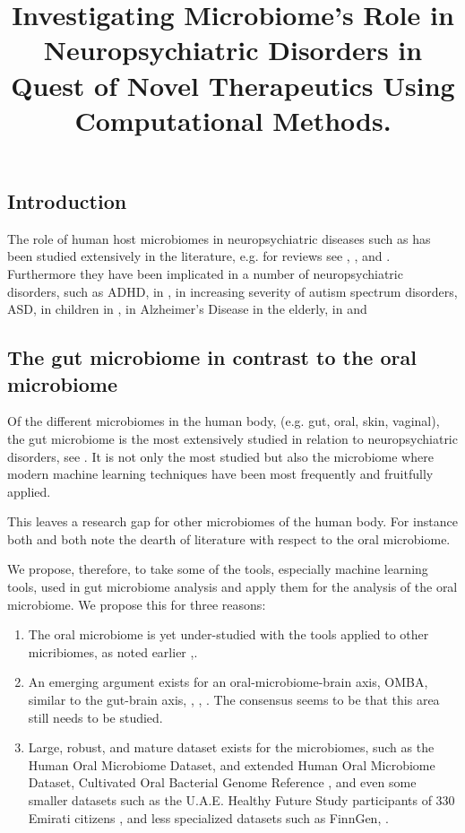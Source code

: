 \documentclass{article}
\title{Investigating Microbiome's Role in Neuropsychiatric Disorders in Quest of Novel Therapeutics Using Computational Methods.}
\begin{document}
\maketitle
\noindent
\begin{multicols}{2}
\section{Introduction}
The role of human host microbiomes in neuropsychiatric diseases such as has been studied extensively in the literature, e.g. for reviews see \cite{goswami_role_2021}, \cite{hashimoto_emerging_2023}, and \cite{bonnechere}. Furthermore they have been implicated in a number of neuropsychiatric disorders, such as ADHD, in \cite{bull-larsen_potential_2019}, in increasing severity of autism spectrum disorders, ASD, in children in \cite{TOMOVA2015179}, in Alzheimer's Disease in the elderly, in \cite{yk_microbiota-gut-brain_2018} and \cite{escobar_influence_2022}
\subsection{The gut microbiome in contrast to the oral microbiome}
Of the different microbiomes in the human body, (e.g. gut, oral, skin, vaginal), the gut microbiome is the most extensively studied in relation to neuropsychiatric disorders, see \cite{sorboni_comprehensive_2022}. It is not only the most studied but also the microbiome where modern machine learning techniques have been most frequently and fruitfully applied. 

This leaves a research gap for other microbiomes of the human body. For instance both \cite{goswami_role_2021} and \cite{tao_relationship_2024} both note the dearth of literature with respect to the oral microbiome. 

We propose, therefore, to take some of the tools, especially machine learning tools, used in gut microbiome analysis and apply them for the analysis of the oral microbiome. We propose this for three reasons:

\begin{enumerate}
	\item The oral microbiome is yet under-studied with the tools applied to other micribiomes, as noted earlier \cite{goswami_role_2021},\cite{tao_relationship_2024}.
	\item An emerging argument exists for an oral-microbiome-brain axis, OMBA, similar to the gut-brain axis, \cite{bowland_oral-microbiome-brain_2022}, \cite{xi_coming_2024}, \cite{y_did_2020}. The consensus seems to be that this area still needs to be studied.
	\item Large, robust, and mature dataset exists for the microbiomes, such as the Human Oral Microbiome Dataset, and extended Human Oral Microbiome Dataset\cite{homd}, Cultivated Oral Bacterial Genome Reference \cite{li_catalog_2023}, and even some smaller datasets such as the U.A.E. Healthy Future Study participants of 330 Emirati citizens \cite{noauthor_human_nodate}, and less specialized datasets such as FinnGen, \cite{noauthor_finngen_nodate}.
\end{enumerate}

\end{multicols}
\end{document}
